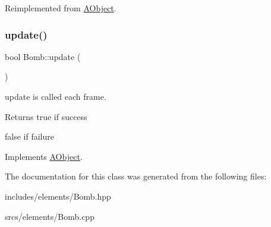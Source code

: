 Reimplemented from \hyperlink{class_a_object_a39b1720ae5a820512ab4db0906f03b15}{A\+Object}.

\mbox{\label{class_bomb_a9808d8efcc57b9ce7b0bd48d95875aad}} 
\subsubsection{\texorpdfstring{update()}{update()}}
{\footnotesize\ttfamily bool Bomb\+::update (\begin{DoxyParamCaption}{ }\end{DoxyParamCaption})\hspace{0.3cm}{\ttfamily [virtual]}}



update is called each frame. 

\begin{DoxyReturn}{Returns}
true if success 

false if failure 
\end{DoxyReturn}


Implements \hyperlink{class_a_object_af35bb4b68af0a11bb1fcf617bde41ecd}{A\+Object}.



The documentation for this class was generated from the following files\+:\begin{DoxyCompactItemize}
\item 
includes/elements/Bomb.\+hpp\item 
srcs/elements/Bomb.\+cpp\end{DoxyCompactItemize}
